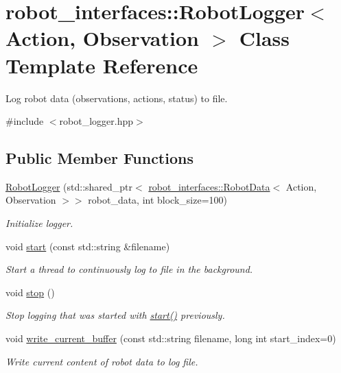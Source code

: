 \hypertarget{classrobot__interfaces_1_1RobotLogger}{}\section{robot\+\_\+interfaces\+:\+:Robot\+Logger$<$ Action, Observation $>$ Class Template Reference}
\label{classrobot__interfaces_1_1RobotLogger}


Log robot data (observations, actions, status) to file.  




{\ttfamily \#include $<$robot\+\_\+logger.\+hpp$>$}

\subsection*{Public Member Functions}
\begin{DoxyCompactItemize}
\item 
\hyperlink{classrobot__interfaces_1_1RobotLogger_aacc60628e6fd5ca26f15dfe51763697d}{Robot\+Logger} (std\+::shared\+\_\+ptr$<$ \hyperlink{classrobot__interfaces_1_1RobotData}{robot\+\_\+interfaces\+::\+Robot\+Data}$<$ Action, Observation $>$$>$ robot\+\_\+data, int block\+\_\+size=100)
\begin{DoxyCompactList}\small\item\em Initialize logger. \end{DoxyCompactList}\item 
void \hyperlink{classrobot__interfaces_1_1RobotLogger_a7a1b50c75aab3255ac7e6d412de833d1}{start} (const std\+::string \&filename)
\begin{DoxyCompactList}\small\item\em Start a thread to continuously log to file in the background. \end{DoxyCompactList}\item 
void \hyperlink{classrobot__interfaces_1_1RobotLogger_a55ec7dcacd849adee53fa49a2a0c8234}{stop} ()
\begin{DoxyCompactList}\small\item\em Stop logging that was started with {\ttfamily \hyperlink{classrobot__interfaces_1_1RobotLogger_a7a1b50c75aab3255ac7e6d412de833d1}{start()}} previously. \end{DoxyCompactList}\item 
void \hyperlink{classrobot__interfaces_1_1RobotLogger_ada7467fbac96a67ab798c4e6ef56c9b1}{write\+\_\+current\+\_\+buffer} (const std\+::string filename, long int start\+\_\+index=0)
\begin{DoxyCompactList}\small\item\em Write current content of robot data to log file. \end{DoxyCompactList}\end{DoxyCompactItemize}
